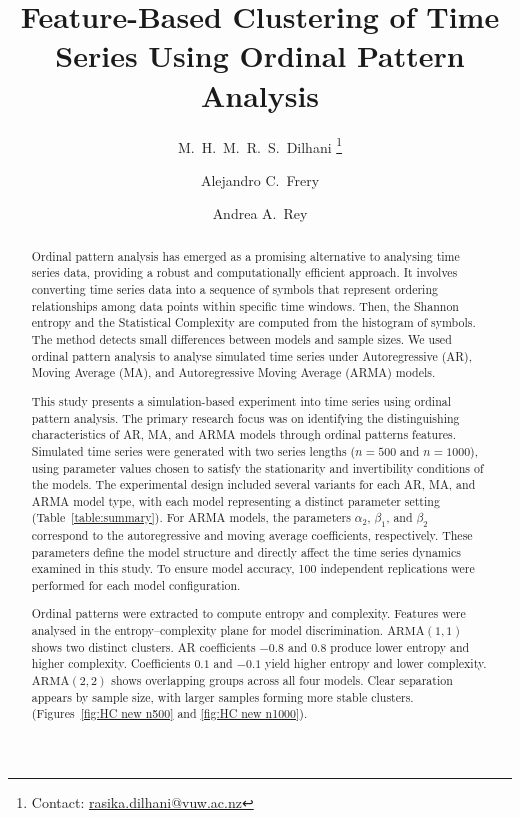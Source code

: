 \documentclass[11pt,a4paper]{article}
\title{\vspace{-1cm}Feature-Based Clustering of Time Series Using Ordinal Pattern Analysis\vspace{-0.3cm}}
\author[1]{M.\ H.\ M.\ R.\ S.\ Dilhani \thanks{Contact: \href{mailto:rasika.dilhani@vuw.ac.nz}{rasika.dilhani@vuw.ac.nz}}}
\author[1]{Alejandro C.\ Frery}
\author[2]{Andrea A.\ Rey}
\affil[1]{School of Mathematics and Statistics, Victoria University of Wellington, New Zealand}
\affil[2]{Laboratorio de Investigación y Desarrollo Experimental en Computación (LIDEC), Universidad Nacional de Hurlingham (UNAHUR), Argentina}
\date{}
\begin{document}
	\maketitle
	\vspace{-0.5cm}
	
	\begin{abstract}
	
	
Ordinal pattern analysis has emerged as a promising alternative to analysing time series data, providing a robust and computationally efficient approach. 
It involves converting time series data into a sequence of symbols that represent ordering relationships among data points within specific time windows.  
Then, the Shannon entropy and the Statistical Complexity are computed from the histogram of symbols. 
The method detects small differences between models and sample sizes.
We used ordinal pattern analysis to analyse simulated time series under Autoregressive (AR), Moving Average (MA), and Autoregressive Moving Average (ARMA) models. 
	
This study presents a simulation-based experiment into time series using ordinal pattern analysis. 
The primary research focus was on identifying the distinguishing characteristics of AR, MA, and ARMA models through ordinal patterns features. 
Simulated time series were generated with two series lengths ($n = 500$ and $n = 1000$), using parameter values chosen to satisfy the stationarity and invertibility conditions of the models. 
The experimental design included several variants for each AR, MA, and ARMA model type, with each model representing a distinct parameter setting (Table~\ref{table:summary}). 
For ARMA models, the parameters $\alpha_2$, $\beta_1$, and $\beta_2$ correspond to the autoregressive and moving average coefficients, respectively. 
These parameters define the model structure and directly affect the time series dynamics examined in this study. 
To ensure model accuracy, 100 independent replications were performed for each model configuration.

Ordinal patterns were extracted to compute entropy and complexity. 
Features were analysed in the entropy–complexity plane for model discrimination. 
$\mathrm{ARMA}(1,1)$ shows two distinct clusters.
AR coefficients $-0.8$ and $0.8$ produce lower entropy and higher complexity. 
Coefficients $0.1$ and $-0.1$ yield higher entropy and lower complexity. 
$\mathrm{ARMA}(2,2)$ shows overlapping groups across all four models. 
Clear separation appears by sample size, with larger samples forming more stable clusters. (Figures~\ref{fig:HC new n500} and \ref{fig:HC new n1000}).


\end{abstract}
\end{document}

